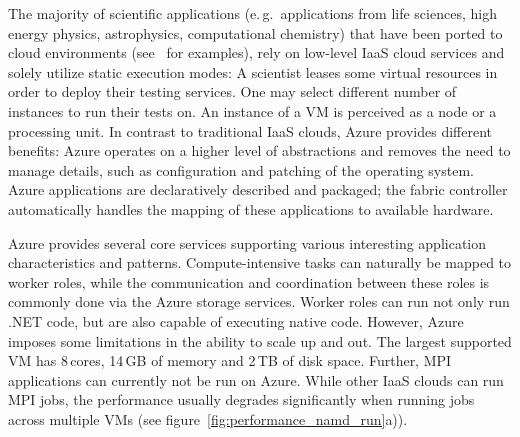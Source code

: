 \documentclass[3p,twocolumn]{elsarticle}
\begin{document}
The majority of scientific applications (e.\,g.\ applications from life
sciences, high energy physics, astrophysics, computational chemistry)
that have been ported to cloud environments
(see~\cite{Hill,Begin:2008rq,saga_grid_cloud_interop} for examples),
rely on low-level IaaS cloud services and solely utilize static
execution modes: A scientist leases some virtual resources in order to
deploy their testing services. One may select different number of
instances to run their tests on. An instance of a VM is perceived as a
node or a processing unit. 
In contrast to traditional IaaS clouds, Azure provides different benefits: 
Azure operates on a higher level of abstractions and removes the need to manage details, such as
configuration and patching of the operating system. Azure applications
are declaratively described and packaged; the fabric controller
automatically handles the mapping of these applications to available
hardware.



Azure provides several core services supporting various interesting
application characteristics and patterns. Com\-pute-intensive tasks can
naturally be mapped to worker roles, while the communication and
coordination between these roles is commonly done via the Azure
storage services. Worker roles can run not only run .NET code, but are
also capable of executing native code. However, Azure imposes some
limitations in the ability to scale up and out. The largest supported
VM has 8\,cores, 14\,GB of memory and 2\,TB of disk space.  Further,
MPI applications can currently not be run on Azure. While other IaaS
clouds can run MPI jobs, the performance usually degrades
significantly when running jobs across multiple VMs (see
figure~\ref{fig:performance_namd_run}a)). %
\end{document}
